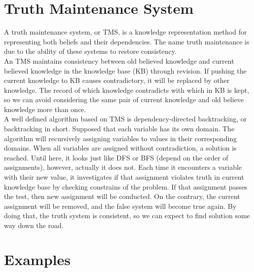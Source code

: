 \documentclass[a4paper, 11pt]{article}
\begin{document}
\section{Truth Maintenance System}
A truth maintenance system, or TMS, is a knowledge representation method for representing both beliefs and their dependencies. The name truth maintenance is due to the ability of these systems to restore consistency. \\
\indent An TMS maintains consistency between old believed knowledge and current believed knowledge in the knowledge base (KB) through revision. If pushing the current knowledge to KB causes contradictory, it will be replaced by other knowledge. The record of which knowledge contradicts with which in KB is kept, so we can avoid considering the same pair of current knowledge and old believe knowledge more than once. \\
\indent A well defined algorithm based on TMS is dependency-directed backtracking, or backtracking in short. Supposed that each variable has its own domain. The algorithm will recursively assigning variables to values in their corresponding domains. When all variables are assigned without contradiction, a solution is reached. Until here, it looks just like DFS or BFS (depend on the order of assignments), however, actually it does not. Each time it encounters a variable with their new value, it investigates if that assignment violates truth in current knowledge base by checking constrains of the problem. If that assignment passes the test, then new assignment will be conducted. On the contrary, the current assignment will be removed, and the false system will become true again. By doing that, the truth system is consistent, so we can expect to find solution some way down the road.
\newpage

\section{Examples}
\end{document}
